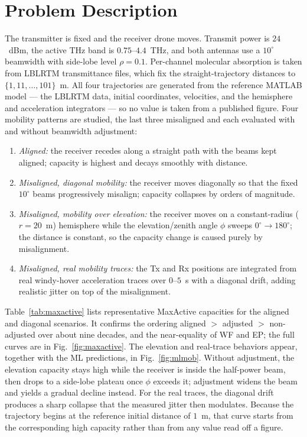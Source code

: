 \documentclass[journal]{IEEEtran}
\begin{document}
\section{Problem Description}
\label{sec:problem}
The transmitter is fixed and the receiver drone moves. Transmit power is $24$~dBm, the
active THz band is $0.75$--$4.4$~THz, and both antennas use a $10^\circ$ beamwidth with
side-lobe level $\rho=0.1$. Per-channel molecular absorption is taken from LBLRTM
transmittance files, which fix the straight-trajectory distances to
$\{1,11,\dots,101\}$~m. All four trajectories are generated from the reference MATLAB
model --- the LBLRTM data, initial coordinates, velocities, and the hemisphere and
acceleration integrators --- so no value is taken from a published figure. Four mobility
patterns are studied, the last three misaligned and each evaluated with and without
beamwidth adjustment:
\begin{enumerate}
\item \emph{Aligned:} the receiver recedes along a straight path with the beams kept
aligned; capacity is highest and decays smoothly with distance.
\item \emph{Misaligned, diagonal mobility:} the receiver moves diagonally so that the
fixed $10^\circ$ beams progressively misalign; capacity collapses by orders of magnitude.
\item \emph{Misaligned, mobility over elevation:} the receiver moves on a
constant-radius ($r{=}20$~m) hemisphere while the elevation/zenith angle $\phi$ sweeps
$0^\circ\!\to\!180^\circ$; the distance is constant, so the capacity change is caused
purely by misalignment.
\item \emph{Misaligned, real mobility traces:} the Tx and Rx positions are integrated
from real windy-hover acceleration traces over $0$--$5$~s with a diagonal drift, adding
realistic jitter on top of the misalignment.
\end{enumerate}
Table~\ref{tab:maxactive} lists representative MaxActive capacities for the aligned and
diagonal scenarios. It confirms the ordering aligned $>$ adjusted $>$ non-adjusted over
about nine decades, and the near-equality of WF and EP; the full curves are in
Fig.~\ref{fig:maxactive}. The elevation and real-trace behaviors appear, together with the
ML predictions, in Fig.~\ref{fig:mlmob}. Without adjustment, the elevation capacity stays
high while the receiver is inside the half-power beam, then drops to a side-lobe plateau
once $\phi$ exceeds it; adjustment widens the beam and yields a gradual decline instead.
For the real traces, the diagonal drift produces a sharp collapse that the measured jitter
then modulates. Because the trajectory begins at the reference initial distance of $1$~m,
that curve starts from the corresponding high capacity rather than from any value read off
a figure.
\end{document}
